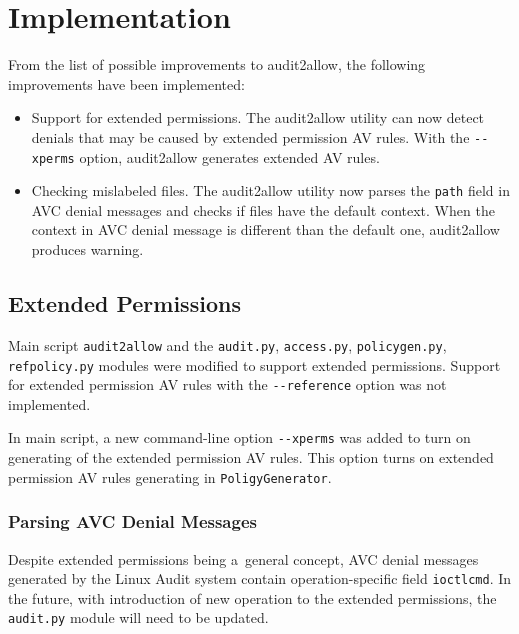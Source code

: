 \chapter{Implementation}
\label{implementation}
From the list of possible improvements to audit2allow, the following
improvements have been implemented:
\begin{itemize}
    \item Support for extended permissions. The audit2allow utility can now
        detect denials that may be caused by extended permission AV rules. With
        the \texttt{-{}-xperms} option, audit2allow generates extended AV rules.
    \item Checking mislabeled files. The audit2allow utility now parses the
        \texttt{path} field in AVC denial messages and checks if files have the
        default context. When the context in AVC denial message is different
        than the default one, audit2allow produces warning.
\end{itemize}

\section{Extended Permissions}
\label{xpermsimp}
Main script \texttt{audit2allow} and the \texttt{audit.py}, \texttt{access.py},
\texttt{policygen.py}, \texttt{refpolicy.py} modules were modified to support
extended permissions. Support for extended permission AV rules with the
\texttt{-{}-reference} option was not implemented.

In main script, a new command-line option \texttt{-{}-xperms} was added to turn
on generating of the extended permission AV rules. This option turns on extended
permission AV rules generating in \texttt{PoligyGenerator}.

\subsection{Parsing AVC Denial Messages}
Despite extended permissions being a~general concept, AVC denial messages
generated by the Linux Audit system contain operation-specific field
\texttt{ioctlcmd}. In the future, with introduction of new operation to the
extended permissions, the \texttt{audit.py} module will need to be updated.

